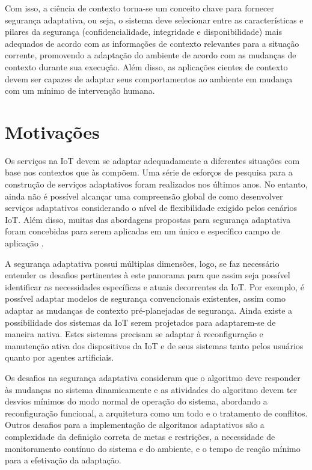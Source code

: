 \documentclass[tid,table]{texufpel} %
\begin{document}
Com isso, a ciência de contexto torna-se um conceito chave para fornecer segurança adaptativa, ou seja, o sistema deve selecionar entre as características e pilares da segurança (confidencialidade, integridade e disponibilidade) mais adequados de acordo com as informações de contexto relevantes para a situação corrente, promovendo a adaptação do ambiente de acordo com as mudanças de contexto durante sua execução. Além disso, as aplicações cientes de contexto devem ser capazes de adaptar seus comportamentos ao ambiente em mudança com um mínimo de intervenção humana.


\section{Motivações}

Os serviços na IoT devem se adaptar adequadamente a diferentes situações com base nos contextos que às compõem. Uma série de esforços de pesquisa para a construção de serviços adaptativos foram realizados nos últimos anos. No entanto, ainda não é possível alcançar uma compreensão global de como desenvolver serviços adaptativos considerando o nível de flexibilidade exigido pelos cenários IoT. Além disso, muitas das abordagens propostas para segurança adaptativa foram concebidas para serem aplicadas em um único e específico campo de aplicação \cite{miorandi12}.

A segurança adaptativa possui múltiplas dimensões, logo, se faz necessário entender os desafios pertinentes à este panorama para que assim seja possível identificar as necessidades específicas e atuais decorrentes da IoT. Por exemplo, é possível adaptar modelos de segurança convencionais existentes, assim como adaptar as mudanças de contexto pré-planejadas de segurança. Ainda existe a possibilidade dos sistemas da IoT serem projetados para adaptarem-se de maneira nativa. Estes sistemas precisam se adaptar à reconfiguração e manutenção ativa dos dispositivos da IoT e de seus sistemas tanto pelos usuários quanto por agentes artificiais.

Os desafios na segurança adaptativa consideram que o algoritmo deve responder às mudanças no sistema dinamicamente e as atividades do algoritmo devem ter desvios mínimos do modo normal de operação do sistema, abordando a reconfiguração funcional, a arquitetura como um todo e o tratamento de conflitos. Outros desafios para a implementação de algoritmos adaptativos são a complexidade da definição correta de metas e restrições, a necessidade de monitoramento contínuo do sistema e do ambiente, e o tempo de reação mínimo para a efetivação da adaptação.
\end{document}
